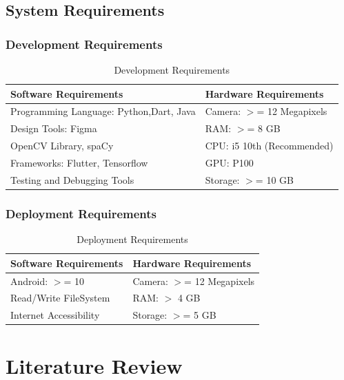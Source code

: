 \section{System Requirements}

\subsection{Development Requirements}
\begin{table}[h]
    \centering
    \caption{Development Requirements}
    \begin{tabular}{|l|l|}
        \hline
        \textbf{Software Requirements} & \textbf{Hardware Requirements}\\ \hline
        Programming Language: Python,Dart, Java & Camera: \(>\)= 12 Megapixels\\ \hline
        Design Tools: Figma & RAM: \(>\)= 8 GB\\ \hline
        OpenCV Library, spaCy & CPU: i5 10th (Recommended)\\ \hline
        Frameworks: Flutter, Tensorflow & GPU: P100\\ \hline
        Testing and Debugging Tools & Storage: \(>\)= 10 GB\\ \hline
    \end{tabular}
\end{table}
\newpage
\subsection{Deployment Requirements}
\begin{table}[ht]
    \centering
    \caption{Deployment Requirements}
    \begin{tabular}{|l|l|}
        \hline
        \textbf{Software Requirements} & \textbf{Hardware Requirements}\\ \hline
        Android: \(>\)= 10 & Camera: \(>\)= 12 Megapixels\\ \hline
        Read/Write FileSystem& RAM: \(>\) 4 GB\\ \hline
        Internet Accessibility & Storage: \(>\)= 5 GB\\ \hline
    \end{tabular}
\end{table}


\chapter{Literature Review}

